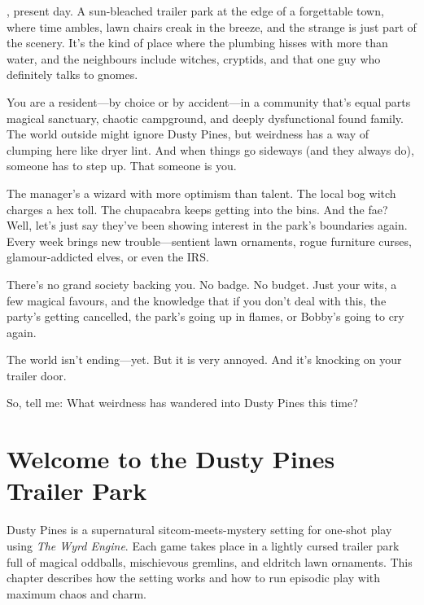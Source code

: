 

\begin{WyrdSettingHeading}
    , present day. A sun-bleached trailer park at the edge of a forgettable town, where time ambles, lawn chairs creak in the breeze, and the strange is just part of the scenery. It’s the kind of place where the plumbing hisses with more than water, and the neighbours include witches, cryptids, and that one guy who definitely talks to gnomes.

    You are a resident—by choice or by accident—in a community that’s equal parts magical sanctuary, chaotic campground, and deeply dysfunctional found family. The world outside might ignore Dusty Pines, but weirdness has a way of clumping here like dryer lint. And when things go sideways (and they always do), someone has to step up. That someone is you.

    The manager’s a wizard with more optimism than talent. The local bog witch charges a hex toll. The chupacabra keeps getting into the bins. And the fae? Well, let’s just say they’ve been showing interest in the park’s boundaries again. Every week brings new trouble—sentient lawn ornaments, rogue furniture curses, glamour-addicted elves, or even the IRS.

    There’s no grand society backing you. No badge. No budget. Just your wits, a few magical favours, and the knowledge that if you don’t deal with this, the party’s getting cancelled, the park’s going up in flames, or Bobby’s going to cry again.

    The world isn’t ending—yet. But it is very annoyed. And it’s knocking on your trailer door.

    So, tell me: What weirdness has wandered into Dusty Pines this time?
\end{WyrdSettingHeading}

\section[Welcome to the Dusty Pines Trailer Park]{Welcome to the Dusty Pines Trailer Park}

Dusty Pines is a supernatural sitcom-meets-mystery setting for one-shot play using \textit{The Wyrd Engine}. Each game takes place in a lightly cursed trailer park full of magical oddballs, mischievous gremlins, and eldritch lawn ornaments. This chapter describes how the setting works and how to run episodic play with maximum chaos and charm.

